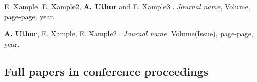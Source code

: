 \documentclass[12pt,a4paper]{extarticle}
\begin{document}
\begin{enumerate}[wide = 0pt, widest = {[4]}, leftmargin =*]

\item[{[1]}] E. Xample, E. Xample2, \textbf{A. Uthor} and E. Xample3
.
\newblock \emph{Journal name}, Volume, page-page, year.

\vspace*{1em}

\item[{[2]}] \textbf{A. Uthor}, E. Xample, E. Xample2
.
\newblock \emph{Journal name}, Volume(Issue), page-page, year.

\end{enumerate}

\vspace*{1em}

\subsection*{Full papers in conference proceedings}
\vspace*{1em}
\end{document}

